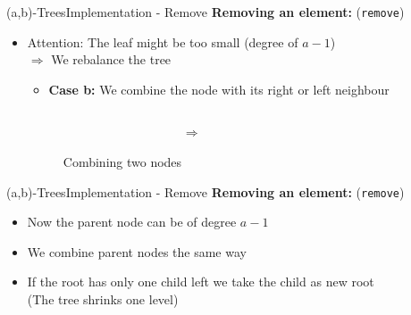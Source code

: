 \begin{frame}{(a,b)-Trees}{Implementation - Remove}
  \textbf{Removing an element:} (\texttt{\color{Mittel-Blau}remove})
  \begin{itemize}
    \item<2->
      {\color{cyan}Attention:} The leaf might be too small (degree of {\color{Mittel-Blau}$a-1$})\\
      $\Rightarrow$ We {\color{Mittel-Blau}rebalance} the tree
      \vspace{0.5em}
      \begin{itemize}
        \item<3->
          \textbf{Case b:}
          We {\color{Mittel-Blau}combine} the node with its right or left
          neighbour
      \end{itemize}
      \begin{figure}
        \begin{columns}
          \begin{column}{0.45\linewidth}
            \begin{adjustbox}{width=\linewidth}
              
            \end{adjustbox}
          \end{column}
          \begin{column}{0.1\linewidth}
            \begin{center}
              $\Rightarrow$
            \end{center}
          \end{column}
          \begin{column}{0.45\linewidth}
            \begin{adjustbox}{width=0.85\linewidth}
              
            \end{adjustbox}
          \end{column}
        \end{columns}
        \caption{Combining two nodes}
        \label{fig:a_b_tree:merge}
      \end{figure}
  \end{itemize}
\end{frame}


\begin{frame}{(a,b)-Trees}{Implementation - Remove}
  \textbf{Removing an element:} (\texttt{\color{Mittel-Blau}remove})
  \begin{itemize}
    \item<2->
      Now the parent node can be of degree {\color{Mittel-Blau}$a-1$}
    \item<3->
      We {\color{Mittel-Blau}combine} parent nodes the same way
    \item<4->
      If the root has only one child left we take the child as new root\\
      (The tree shrinks one level)
  \end{itemize}
\end{frame}

